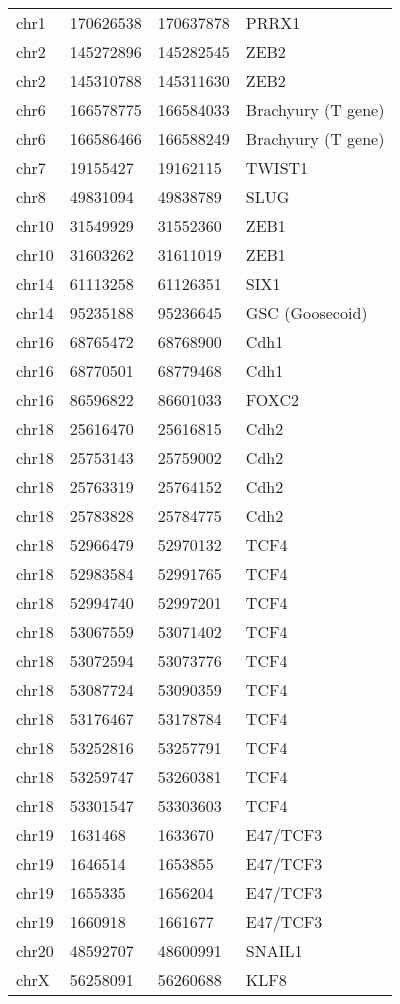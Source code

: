 \begin{footnotesize}
\begin{tabular}[H]{llll}
chr1 &	170626538 &	170637878 &	PRRX1 \\
chr2	& 145272896 & 145282545 & ZEB2 \\
chr2 &	145310788 & 145311630 & ZEB2 \\
chr6 &	166578775 & 166584033 & Brachyury (T gene) \\
chr6	& 166586466 & 166588249 & Brachyury (T gene) \\
chr7	& 19155427	 & 19162115 & TWIST1 \\
chr8	& 49831094	 & 49838789 & SLUG \\
chr10 & 31549929 & 31552360 & ZEB1 \\
chr10 & 31603262 & 31611019 & ZEB1 \\
chr14 & 61113258 & 61126351 & SIX1 \\
chr14 & 95235188 & 95236645 & GSC (Goosecoid) \\
chr16 & 68765472 & 68768900 & Cdh1 \\
chr16 & 68770501 & 68779468 & Cdh1 \\
chr16 & 86596822 & 86601033 & FOXC2 \\
chr18 & 25616470 & 25616815 & Cdh2 \\
chr18 & 25753143 & 25759002 & Cdh2 \\
chr18 & 25763319 & 25764152 & Cdh2 \\
chr18 & 25783828 & 25784775 & Cdh2 \\
chr18 & 52966479 & 52970132 & TCF4 \\
chr18 & 52983584 & 52991765 & TCF4 \\
chr18 & 52994740 & 52997201	& TCF4 \\
chr18 & 53067559 & 53071402	& TCF4 \\
chr18 & 53072594 & 53073776	& TCF4 \\
chr18 & 53087724 & 53090359	& TCF4 \\
chr18 & 53176467 & 53178784	& TCF4 \\
chr18 & 53252816 & 53257791	& TCF4 \\
chr18 & 53259747 & 53260381	& TCF4 \\
chr18 & 53301547 & 53303603	& TCF4 \\
chr19 & 1631468	 & 1633670	& E47/TCF3 \\
chr19 & 1646514	 & 1653855	& E47/TCF3 \\
chr19 & 1655335	 & 1656204	& E47/TCF3 \\
chr19 & 1660918	 & 1661677	& E47/TCF3  \\
chr20 & 48592707 & 48600991 & SNAIL1  \\
chrX & 56258091 & 56260688 &KLF8 \\


\end{tabular}
\end{footnotesize}
